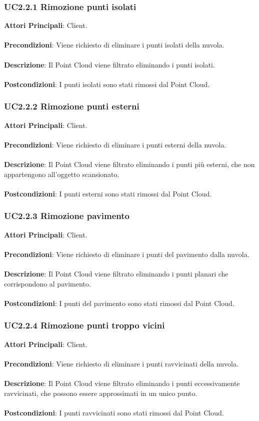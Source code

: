 \subsubsection{UC2.2.1 Rimozione punti isolati}
\textbf{Attori Principali}: Client.
\\\\ \textbf{Precondizioni}: Viene richiesto di eliminare i punti isolati della nuvola.
\\\\ \textbf{Descrizione}: Il Point Cloud viene filtrato eliminando i punti isolati.
\\\\ \textbf{Postcondizioni}: I punti isolati sono stati rimossi dal Point Cloud.

\subsubsection{UC2.2.2 Rimozione punti esterni}
\textbf{Attori Principali}: Client.
\\\\ \textbf{Precondizioni}: Viene richiesto di eliminare i punti esterni della nuvola.
\\\\ \textbf{Descrizione}: Il Point Cloud viene filtrato eliminando i punti più esterni, che non appartengono all'oggetto scansionato.
\\\\ \textbf{Postcondizioni}: I punti esterni sono stati rimossi dal Point Cloud.

\subsubsection{UC2.2.3 Rimozione pavimento}
\textbf{Attori Principali}: Client.
\\\\ \textbf{Precondizioni}: Viene richiesto di eliminare i punti del pavimento dalla nuvola.
\\\\ \textbf{Descrizione}: Il Point Cloud viene filtrato eliminando i punti planari che corrispondono al pavimento.
\\\\ \textbf{Postcondizioni}: I punti del pavimento sono stati rimossi dal Point Cloud.

\subsubsection{UC2.2.4 Rimozione punti troppo vicini}
\textbf{Attori Principali}: Client.
\\\\ \textbf{Precondizioni}: Viene richiesto di eliminare i punti ravvicinati della nuvola.
\\\\ \textbf{Descrizione}: Il Point Cloud viene filtrato eliminando i punti eccessivamente ravvicinati, che possono essere approssimati in un unico punto.
\\\\ \textbf{Postcondizioni}: I punti ravvicinati sono stati rimossi dal Point Cloud.

